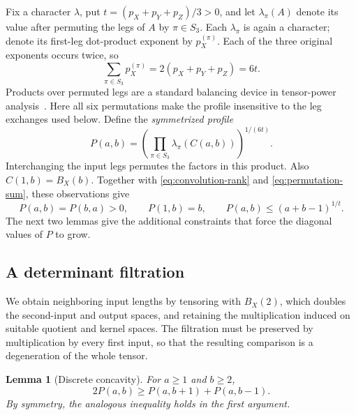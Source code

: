 \documentclass[11pt]{article}
\newtheorem{lemma}[theorem]{Lemma}
\theoremstyle{definition}
\theoremstyle{remark}
\numberwithin{equation}{section}
\begin{document}
Fix a character $\lambda$, put $t=(p_X+p_Y+p_Z)/3>0$, and let
$\lambda_\pi(A)$ denote its value after permuting the legs of $A$ by
$\pi\in S_3$. Each $\lambda_\pi$ is again a character; denote its
first-leg dot-product exponent by $p_X^{(\pi)}$. Each of the three
original exponents occurs twice, so
\begin{equation}\label{eq:permutation-sum}
 \sum_{\pi\in S_3}p_X^{(\pi)}=2(p_X+p_Y+p_Z)=6t.
\end{equation}
Products over permuted legs are a standard balancing device in
tensor-power analysis~\cite[Appendix~A.3 of the full version]{LG14}.
Here all six permutations make the profile insensitive to the leg
exchanges used below. Define the \emph{symmetrized profile}
\begin{equation}\label{eq:profile}
 P(a,b)=\left(\prod_{\pi\in S_3}\lambda_\pi(C(a,b))\right)^{1/(6t)}.
\end{equation}
Interchanging the input legs permutes the factors in this product.
Also $C(1,b)=B_X(b)$. Together with \eqref{eq:convolution-rank} and
\eqref{eq:permutation-sum}, these observations give
\begin{equation}\label{eq:profile-basic}
 P(a,b)=P(b,a)>0,\qquad P(1,b)=b,\qquad
 P(a,b)\leq(a+b-1)^{1/t}.
\end{equation}
The next two lemmas give the additional constraints that force the
diagonal values of $P$ to grow.

\subsection{A determinant filtration}

We obtain neighboring input lengths by tensoring with $B_X(2)$,
which doubles the second-input and output spaces, and retaining the
multiplication induced on suitable quotient and kernel spaces.
The filtration must be preserved by multiplication by every first
input, so that the resulting comparison is a degeneration of the
whole tensor.

\begin{lemma}[Discrete concavity]\label{lem:concavity}
For $a\geq1$ and $b\geq2$,
\begin{equation}\label{eq:concavity}
 2P(a,b)\geq P(a,b+1)+P(a,b-1).
\end{equation}
By symmetry, the analogous inequality holds in the first argument.
\end{lemma}
\end{document}
